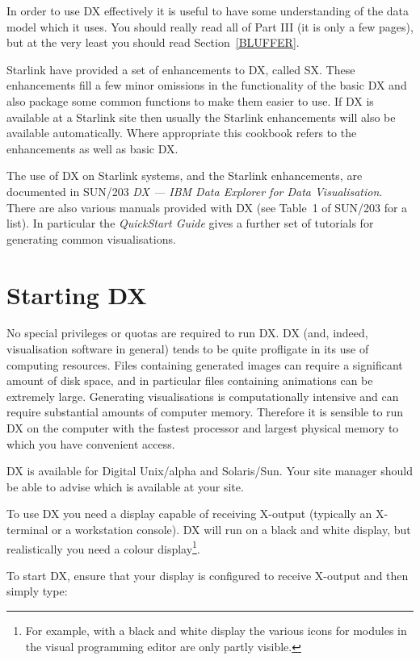 \documentclass[twoside,11pt]{article}
\newcommand{\xref}[3]{#1}
\newcommand{\xlabel}[1]{}
\begin{document}
In order to use DX effectively it is useful to have some
understanding of the data model which it uses. You should really read
all of Part III (it is only a few pages), but at the very least you
should read Section~\ref{BLUFFER}.

Starlink have provided a set of enhancements to DX, called SX. These
enhancements fill a few minor omissions in the functionality of the basic
DX and also package some common functions to make them easier to use. If
DX is available at a Starlink site then usually the Starlink enhancements
will also be available automatically. Where appropriate this cookbook
refers to the enhancements as well as basic DX.

The use of DX on Starlink systems, and the Starlink enhancements, are
documented in SUN/203 \xref{{\it DX --- IBM Data Explorer for Data
Visualisation}}{sun203}{}\cite{SUN203}. There are also various manuals
provided with DX (see  Table~1 of SUN/203 for a list). In particular the
{\it QuickStart Guide}\cite{QUICKS} gives a further set of tutorials for
generating common visualisations.


\section{\xlabel{START}\label{START}Starting DX}
No special privileges or quotas are required to run DX. DX (and, indeed,
visualisation software in general) tends to be quite profligate in its
use of computing resources. Files containing generated images can
require a significant amount of disk space, and in particular files
containing animations can be extremely large. Generating visualisations is
computationally intensive and can require substantial amounts of computer
memory. Therefore it is sensible to run DX on the computer with the
fastest processor and largest physical memory to which you have convenient
access.

DX is available for Digital Unix/alpha and Solaris/Sun.  Your site manager
should be able to advise which is available at your site.

To use DX you need a display capable of receiving X-output (typically an
X-terminal or a workstation console). DX will run on a black and white
display, but realistically you need a colour display\footnote{ For
example, with a black and white display the various icons for modules
in the visual programming editor are only partly visible.}.

To start DX, ensure that your display is configured to receive X-output
and then simply type:
\end{document}
